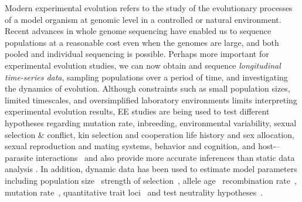 \documentclass[11pt]{article}
\begin{document}
Modern experimental evolution refers to the study of the evolutionary
processes of a model organism at genomic level in a controlled
\cite{hegreness2006equivalence,lang2013pervasive,orozco2012adaptation,
  lang2011genetic,barrick2009genome,bollback2007clonal,oz2014strength}
or natural
\cite{maldarelli2013hiv,reid2011new,denef2012situ,winters2012development,
  daniels2013genetic,barrett2008natural,bergland2014genomic}
environment. Recent advances in whole genome sequencing have enabled
us to sequence populations at a reasonable cost even when the genomes
are large, and both pooled and individual sequencing is
possible. Perhaps more important for experimental evolution studies,
we can now obtain and sequence \emph{longitudinal time-series data},
sampling populations over a period of time, and investigating the
dynamics of evolution. Although constraints such as small population
sizes, limited timescales, and oversimplified laboratory environments
limits interpreting experimental evolution results, EE studies are
being used to test different hypotheses regarding mutation rate,
inbreeding, environmental variability, sexual selection \& conflict,
kin selection and cooperation life history and sex allocation, sexual
reproduction and mating systems, behavior and cognition, and
host-–parasite interactions~\cite{kawecki2012experimental} and also
provide more accurate inferences than static data analysis
\cite{boyko2008assessing,desai2008polymorphism,sawyer1992population}. In
addition, dynamic data has been used to estimate model parameters
including population
size~\cite{williamson1999using,wang2001pseudo,pollak1983new,waples1989generalized,
  Terhorst2015Multi} strength of
selection~\cite{mathieson2013estimating,illingworth2011distinguishing,Terhorst2015Multi,
  bollback2008estimation,illingworth2012quantifying,malaspinas2012estimating,
  Steinrücken2014a}, allele age~\cite{malaspinas2012estimating}
recombination rate~\cite{Terhorst2015Multi}, mutation
rate~\cite{Barrick2013Genome, Terhorst2015Multi}, quantitative trait
loci~\cite{baldwin2014power} and test neutrality
hypotheses~\cite{feder2014Identifying,Terhorst2015Multi,burke2010genome,bergland2014genomic}.
\end{document}
